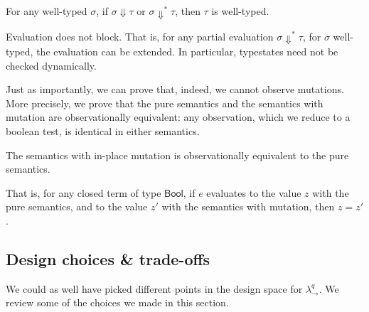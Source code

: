 \documentclass[acmsmall,screen]{acmart}\settopmatter{}
\newcommand{\Varid}[1]{\mathit{#1}}
\renewcommand\Varid[1]{\mathord{\textsf{#1}}}
\newcommand{\varid}[1]{\ensuremath{\Varid{#1}}}
\newcommand\calc{{\ensuremath{λ^q_\to}}}
\begin{document}
\begin{theorem}\label{thm:type-preservation}
  For any well-typed $σ$, if $σ⇓τ$ or $σ⇓^*τ$, then $τ$ is
  well-typed.
\end{theorem}
\begin{theorem}[Progress]\label{thm:progress}
  Evaluation does not block. That is, for any partial evaluation
  $σ⇓^*τ$, for $σ$ well-typed, the evaluation can be
  extended.
  In particular, typestates need not be checked dynamically.
\end{theorem}

Just as importantly, we can prove that, indeed, we cannot observe
mutations. More precisely, we prove that the pure semantics and the
semantics with mutation are observationally equivalent: any observation, which we
reduce to a boolean test, is identical in either semantics.
\begin{theorem}\label{thm:obs-equiv}
  The semantics with in-place mutation is observationally equivalent
  to the pure semantics.

  That is, for any closed term of type $\varid{Bool}$, if $e$ evaluates
  to the value $z$ with the pure semantics, and to the value $z'$ with
  the semantics with mutation, then $z=z'$.
\end{theorem}


\subsection{Design choices \& trade-offs}
\label{sec:design-choices}

We could as well have picked different points in the design space for
\calc{}. We review some of the choices we made in this section.
\end{document}
